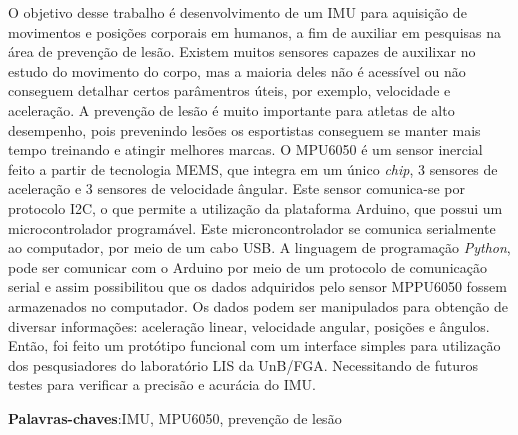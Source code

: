 \begin{resumo}
 
 \noindent
 O objetivo desse trabalho é desenvolvimento de um IMU para aquisição de movimentos e posições corporais em humanos, a fim de auxiliar em pesquisas na área de prevenção de lesão. Existem muitos sensores capazes de auxilixar no estudo do movimento do corpo, mas a maioria deles não é acessível ou não conseguem detalhar certos parâmentros úteis, por exemplo, velocidade e aceleração. A prevenção de lesão é muito importante para atletas de alto desempenho, pois prevenindo lesões os esportistas conseguem se manter mais tempo treinando e atingir melhores marcas. O MPU6050 é um sensor inercial feito a partir de tecnologia MEMS, que integra em um único \textit{chip}, 3 sensores de aceleração e 3 sensores de velocidade ângular. Este sensor comunica-se por protocolo I2C, o que permite a utilização da plataforma Arduino, que possui um microcontrolador programável. Este microncontrolador se comunica serialmente ao computador, por meio de um cabo USB. A linguagem de programação \textit{Python}, pode ser comunicar com o Arduino por meio de um protocolo de comunicação serial e assim possibilitou que os dados adquiridos pelo sensor MPPU6050 fossem armazenados no computador. Os dados podem ser manipulados para obtenção de diversar informações: aceleração linear, velocidade angular, posições e ângulos. Então, foi feito um protótipo funcional com um interface simples para utilização dos pesqusiadores do laboratório LIS da UnB/FGA. Necessitando de futuros testes para verificar a precisão e acurácia do IMU. 
 
 \vspace{\onelineskip}
 \textbf{Palavras-chaves}:IMU, MPU6050, prevenção de lesão
\end{resumo}
